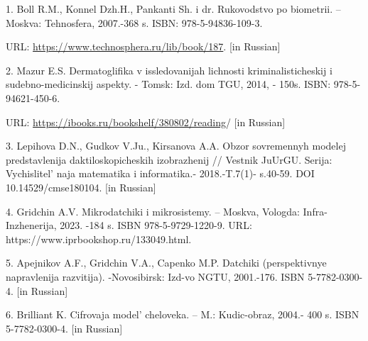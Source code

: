 \begin{references}
1. Boll R.M., Konnel Dzh.H., Pankanti Sh. i dr. Rukovodstvo po
biometrii. -- Moskva: Tehnosfera, 2007.-368 s. ISBN: 978-5-94836-109-3.

URL: \url{https://www.technosphera.ru/lib/book/187}. {[}in Russian{]}

2. Mazur E.S. Dermatoglifika v issledovanijah lichnosti
kriminalisticheskij i sudebno-medicinskij aspekty. - Tomsk: Izd. dom
TGU, 2014, - 150s. ISBN: 978-5-94621-450-6.

URL: \url{https://ibooks.ru/bookshelf/380802/reading}/ {[}in Russian{]}

3. Lepihova D.N., Gudkov V.Ju., Kirsanova A.A. Obzor sovremennyh modelej
predstavlenija daktiloskopi\-cheskih izobrazhenij // Vestnik JuUrGU.
Serija: Vychislitel' naja matematika i informatika.-
2018.-T.7(1)- s.40-59. DOI 10.14529/cmse180104. {[}in Russian{]}

4. Gridchin A.V. Mikrodatchiki i mikrosistemy. -- Moskva, Vologda:
Infra-Inzhenerija, 2023. -184 s. ISBN 978-5-9729-1220-9. URL:
https://www.iprbookshop.ru/133049.html.

5. Apejnikov A.F., Gridchin V.A., Capenko M.P. Datchiki (perspektivnye
napravlenija razvitija). -Novosib\-irsk: Izd-vo NGTU, 2001.-176. ISBN
5-7782-0300-4. {[}in Russian{]}

6. Brilliant K. Cifrovaja model'{} cheloveka. -- M.:
Kudic-obraz, 2004.- 400 s. ISBN 5-7782-0300-4. {[}in Russian{]}
\end{references}

